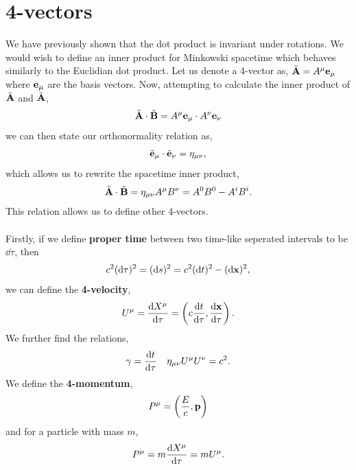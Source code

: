 \documentclass{book}
\begin{document}
\section{4-vectors}
We have previously shown that the dot product is invariant under rotations. We would wish to define an inner product for Minkowski spacetime which behaves similarly to the Euclidian dot product. Let us denote a 4-vector as, $\tilde{\vb{A}} = A^{\mu}\vb{e}_{\mu}$ where $\vb{e}_{\mu}$ are the basis vectors. Now, attempting to calculate the inner product of $\tilde{\vb{A}}$ and $\tilde{\vb{A}}$,
\begin{equation}
	\tilde{\vb{A}} \cdot \tilde{\vb{B}} = A^{\mu}\vb{e}_{\mu} \cdot A^{\nu}\vb{e}_{\nu}
\end{equation}
we can then state our orthonormality relation as,
\begin{equation}
	\tilde{\vb{e}}_{\mu}\cdot\tilde{\vb{e}}_{\nu} = \eta_{\mu\nu},
\end{equation}
which allows us to rewrite the spacetime inner product,
\begin{equation}
	\tilde{\vb{A}} \cdot \tilde{\vb{B}} = \eta_{\mu\nu}A^{\mu}B^{\nu} = A^0B^0 - A^iB^i.
\end{equation}
This relation allows us to define other 4-vectors. 
\\\\
Firstly, if we define \textbf{proper time} between two time-like seperated intervals to be $\dd{\tau}$, then
\begin{equation}
	c^2(\dd{\tau})^2 = (\dd{s})^2 = c^2(\dd{t})^2 - (\dd{\vb{x}})^2,
\end{equation}
we can define the \textbf{4-velocity},
\begin{equation}
	U^{\mu} = \dv{X^{\mu}}{\tau} = \left(c\dv{t}{\tau}, \dv{\vb{x}}{\tau}\right).
\end{equation}
We further find the relations,
\begin{align}
	\gamma = \dv{t}{\tau} && \eta_{\mu\nu}U^{\mu}U^{\nu} = c^2.
\end{align}
We define the \textbf{4-momentum},
\begin{equation}
	P^{\mu}	 = \left(\frac{E}{c}, \vb{p}\right)
\end{equation}
and for a particle with mass $m$,
\begin{equation}
	P^{\mu} = m \dv{X^{\mu}}{\tau} = mU^{\mu}.
\end{equation}
\end{document}
